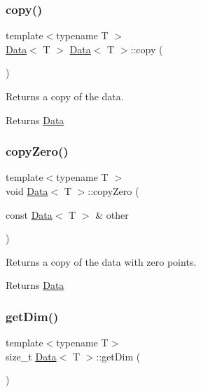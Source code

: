\subsubsection{\texorpdfstring{copy()}{copy()}}
{\footnotesize\ttfamily template$<$typename T $>$ \\
\hyperlink{class_data}{Data}$<$ T $>$ \hyperlink{class_data}{Data}$<$ T $>$\+::copy (\begin{DoxyParamCaption}{ }\end{DoxyParamCaption})}



Returns a copy of the data. 

\begin{DoxyReturn}{Returns}
\hyperlink{class_data}{Data} 
\end{DoxyReturn}
\mbox{\label{class_data_ad94f8c8227a298b5cc0a862658f8cb99}} 
\subsubsection{\texorpdfstring{copy\+Zero()}{copyZero()}}
{\footnotesize\ttfamily template$<$typename T $>$ \\
void \hyperlink{class_data}{Data}$<$ T $>$\+::copy\+Zero (\begin{DoxyParamCaption}\item[{const \hyperlink{class_data}{Data}$<$ T $>$ \&}]{other }\end{DoxyParamCaption})}



Returns a copy of the data with zero points. 

\begin{DoxyReturn}{Returns}
\hyperlink{class_data}{Data} 
\end{DoxyReturn}
\mbox{\label{class_data_a87bdacb790f5a21966308c82b8be44d0}} 
\subsubsection{\texorpdfstring{get\+Dim()}{getDim()}}
{\footnotesize\ttfamily template$<$typename T$>$ \\
size\+\_\+t \hyperlink{class_data}{Data}$<$ T $>$\+::get\+Dim (\begin{DoxyParamCaption}{ }\end{DoxyParamCaption})\hspace{0.3cm}{\ttfamily [inline]}}



